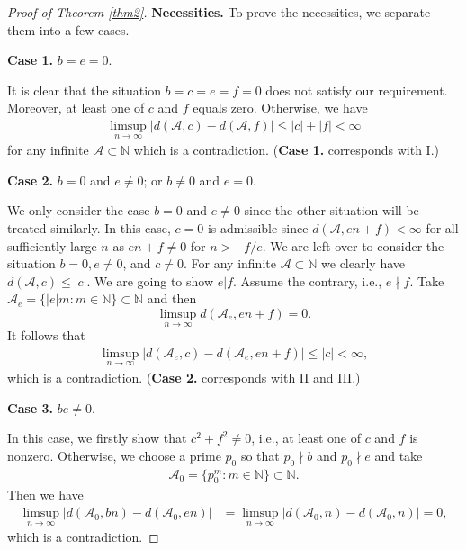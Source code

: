 \documentclass[10pt,a4paper]{amsart}
\begin{document}
\begin{proof}[Proof of Theorem \ref{thm2}]
{\bf Necessities.}
To prove the necessities, we separate them into a few cases.

{\bf Case 1.} $b=e=0$.

It is clear that the situation $b=c=e=f=0$ does not satisfy our requirement. Moreover, at least one of $c$ and $f$ equals zero. Otherwise, we have
\begin{align*}
\limsup_{n\rightarrow\infty}|d(\mathcal{A},c)-d(\mathcal{A},f)|\le |c|+|f|<\infty
\end{align*}
for any infinite $\mathcal{A}\subset \mathbb{N}$ which is a contradiction. ({\bf Case 1.} corresponds with I.)

{\bf Case 2.} $b=0$ and $e\neq 0$; or $b\neq 0$ and $e= 0$.

We only consider the case $b=0$ and $e\neq 0$ since the other situation will be treated similarly. In this case, $c=0$ is admissible since $d(\mathcal{A},en+f)<\infty$ for all sufficiently large $n$ as $en+f\neq 0$ for $n>-f/e$. We are left over to consider the situation $b=0,e\neq 0$, and $c\neq 0$. For any infinite $\mathcal{A}\subset \mathbb{N}$ we clearly have
$
d(\mathcal{A},c)\le |c|.
$
We are going to show $e|f$. Assume the contrary, i.e., $e\nmid f$. Take $\mathcal{A}_e=\{|e|m: m\in \mathbb{N}\}\subset \mathbb{N}$ and then
$$
\limsup_{n\rightarrow\infty}d(\mathcal{A}_e,en+f)=0.
$$ 
It follows that
\begin{align*}
\limsup_{n\rightarrow\infty}|d(\mathcal{A}_e,c)-d(\mathcal{A}_e,en+f)|\le |c|<\infty,
\end{align*}
which is a contradiction. ({\bf Case 2.} corresponds with II and III.)

{\bf Case 3.} $be \neq 0$.

In this case, we firstly show that $c^2+f^2\neq 0$, i.e., at least one of $c$ and $f$ is nonzero. Otherwise, we choose a prime $p_0$ so that $p_0\nmid b$ and $p_0\nmid e$ and take 
\begin{align}\label{newadded1}
\mathcal{A}_0=\{p_0^m: m\in \mathbb{N}\}\subset \mathbb{N}.
\end{align} 
Then we have
\begin{align*}
\limsup_{n\rightarrow\infty}|d(\mathcal{A}_0,bn)-d(\mathcal{A}_0,en)|&=\limsup_{n\rightarrow\infty}|d(\mathcal{A}_0,n)-d(\mathcal{A}_0,n)|=0,
\end{align*} 
which is a contradiction. 


\end{proof}
\end{document}

